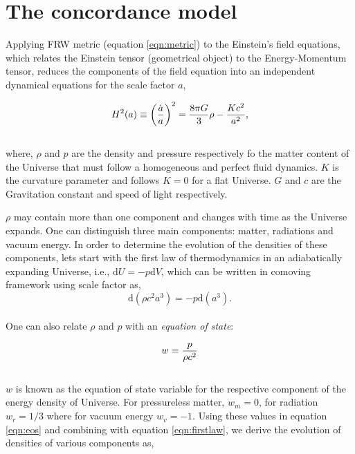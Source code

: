 \section{The concordance model}


Applying FRW metric (equation \ref{eqn:metric}) to the Einstein's field equations, 
which relates the Einstein tensor (geometrical object) to the Energy-Momentum tensor, 
reduces the components of the field equation into an independent dynamical equations
for the scale factor $a$,

\begin{equation}
\centering
H^2(a) \equiv \left( \dfrac{\dot{a}}{a} \right)^2 = 
			\dfrac{8 \pi G}{3} \rho - \dfrac{Kc^2}{a^2},
\label{eqn:fe1}
\end{equation}
\\
where, $\rho$ and $p$ are the density and pressure respectively fo the matter content
of the Universe that must follow a homogeneous and perfect fluid dynamics. 
$K$ is the curvature parameter and follows $K=0$ for a flat Universe. $G$ and $c$ are
the Gravitation constant and speed of light respectively. 

$\rho$ may contain more than one component and changes with time as the Universe 
expands. One can distinguish three main components: matter, radiations and vacuum 
energy. In order to determine the evolution of the densities of these components,
lets start with the first law of thermodynamics in an adiabatically expanding Universe,
i.e., $\mathrm{d}U = -p\mathrm{d}V$, which can be written in comoving framework
using scale factor as,
\begin{equation}
	\mathrm{d}(\rho c^2 a^3) = -p \mathrm{d} (a^3).
	\label{eqn:firstlaw}
\end{equation}
\\
One can also relate $\rho$ and $p$ with an {\it equation of state}:

\begin{equation}
\centering
w = \dfrac{p}{\rho c^2}
\label{eqn:eos}
\end{equation}
\\
$w$ is known as the equation of state variable for the respective component
of the energy density of Universe. For pressureless matter, $w_m=0$,
for radiation $w_r=1/3$ where for vacuum energy $w_v=-1$. Using these values 
in equation \ref{eqn:eos} and combining with equation \ref{eqn:firstlaw}, we 
derive the evolution of densities of various components as,

